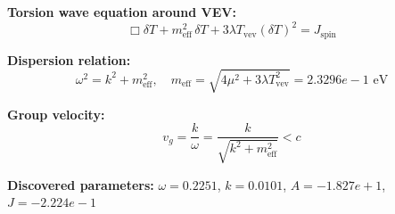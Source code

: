 
\textbf{Torsion wave equation around VEV:}
\begin{equation}
  \Box \delta T + m_{\text{eff}}^2 \, \delta T + 3\lambda T_{\text{vev}} (\delta T)^2 = J_{\text{spin}}
\end{equation}

\textbf{Dispersion relation:}
\begin{equation}
  \omega^2 = k^2 + m_{\text{eff}}^2, \quad
  m_{\text{eff}} = \sqrt{4\mu^2 + 3\lambda T_{\text{vev}}^2} = 2.3296e-1 \text{ eV}
\end{equation}

\textbf{Group velocity:}
\begin{equation}
  v_g = \frac{k}{\omega} = \frac{k}{\sqrt{k^2 + m_{\text{eff}}^2}} < c
\end{equation}

\textbf{Discovered parameters:}
$\omega = 0.2251$, \quad
$k = 0.0101$, \quad
$A = -1.827e+1$, \quad
$J = -2.224e-1$